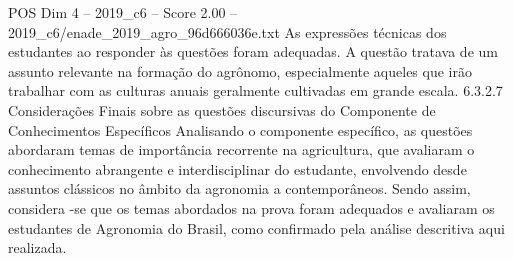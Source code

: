 \begin{textsample}{POS Dim 4 – 2019\_c6 – Score 2.00 – 2019\_c6/enade\_2019\_agro\_96d666036e.txt}
As expressões técnicas dos estudantes ao responder às questões foram adequadas.
A questão tratava de um assunto relevante na formação do agrônomo, especialmente aqueles que irão trabalhar com as culturas anuais geralmente cultivadas em grande escala. 6.3.2.7 Considerações Finais sobre as questões discursivas do Componente de Conhecimentos Específicos Analisando o componente específico, as questões abordaram temas de importância recorrente na agricultura, que avaliaram o conhecimento abrangente e interdisciplinar do estudante, envolvendo desde assuntos clássicos no âmbito da agronomia a contemporâneos.
Sendo assim, considera -se que os temas abordados na prova foram adequados e avaliaram os estudantes de Agronomia do Brasil, como confirmado pela análise descritiva aqui realizada.

\end{textsample}
